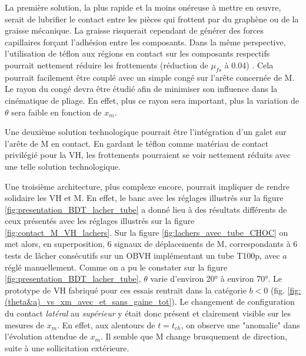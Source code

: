 La première solution, la plus rapide et la moins onéreuse à mettre en \oe{}uvre, serait de lubrifier le contact entre les pièces qui frottent par du graphène ou de la graisse mécanique. La graisse risquerait cependant de générer des forces capillaires forçant l'adhésion entre les composants. Dans la même perspective, l'utilisation de téflon aux régions en contact sur les composants respectifs pourrait nettement réduire les frottements (réduction de $\mu_{fs}$ à 0.04) \cite{Nosonovsky2013}. Cela pourrait facilement être couplé avec un simple congé sur l'arête concernée de M. Le rayon du congé devra être étudié afin de minimiser son influence dans la cinématique de pliage. En effet, plus ce rayon sera important, plus la variation de $\theta$ sera faible en fonction de $x_m$.

Une deuxième solution technologique pourrait être l'intégration d'un galet sur l'arête de M en contact. En gardant le téflon comme matériau de contact privilégié pour la VH, les frottements pourraient se voir nettement réduits avec une telle solution technologique.

Une troisième architecture, plus complexe encore, pourrait impliquer de rendre solidaire les VH et M. En effet, le banc avec les réglages illustrés sur la figure \ref{fig:presentation_BDT_lacher_tube} a donné lieu à des résultats différents de ceux présentés avec les réglages illustrés sur la figure \ref{fig:contact_M_VH_lachers}. Sur la figure \ref{fig:lachers_avec_tube_CHOC} on met alors, en superposition, 6 signaux de déplacements de M, correspondants à 6 tests de lâcher consécutifs sur un OBVH implémentant un tube T100p, avec $a$ réglé manuellement. Comme on a pu le constater sur la figure \ref{fig:presentation_BDT_lacher_tube}, $\theta$ varie d'environ \ang{20} à environ \ang{70}. Le prototype de VH fabriqué pour ces essais rentrait dans la catégorie $b<0$ (fig. \ref{fig:(theta&a)_vs_xm_avec_et_sans_gaine_tot}). Le changement de configuration du contact \emph{latéral} au \emph{supérieur} y était donc présent et clairement visible sur les mesures de $x_m$. En effet, aux alentours de $t=t_{ch}$, on observe une "anomalie" dans l'évolution attendue de $x_m$. Il semble que M change brusquement de direction, suite à une sollicitation extérieure. 

